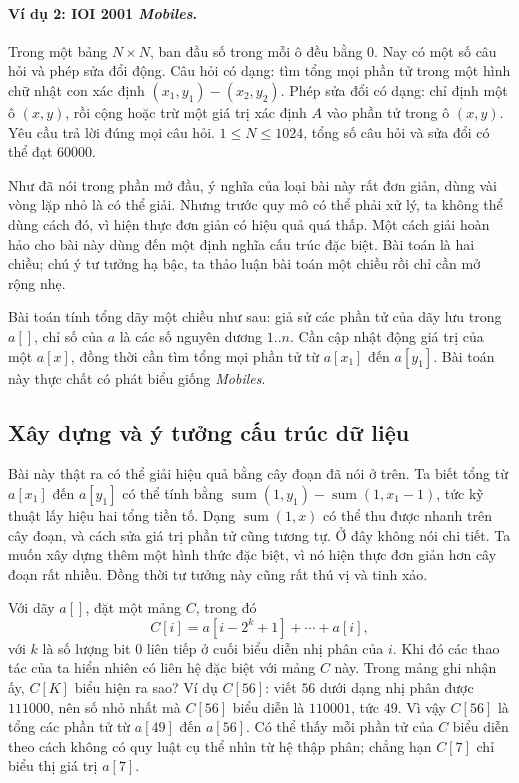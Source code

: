 \documentclass[11pt]{article}
\begin{document}
\paragraph{Ví dụ 2: IOI 2001 \textit{Mobiles}.}
Trong một bảng \(N\times N\), ban đầu số trong mỗi ô đều bằng \(0\). Nay có
một số câu hỏi và phép sửa đổi động. Câu hỏi có dạng: tìm tổng mọi phần tử
trong một hình chữ nhật con xác định \((x_1,y_1)-(x_2,y_2)\). Phép sửa đổi
có dạng: chỉ định một ô \((x,y)\), rồi cộng hoặc trừ một giá trị xác định
\(A\) vào phần tử trong ô \((x,y)\). Yêu cầu trả lời đúng mọi câu hỏi.
\(1\le N\le 1024\), tổng số câu hỏi và sửa đổi có thể đạt \(60000\).

Như đã nói trong phần mở đầu, ý nghĩa của loại bài này rất đơn giản, dùng
vài vòng lặp nhỏ là có thể giải. Nhưng trước quy mô có thể phải xử lý, ta
không thể dùng cách đó, vì hiện thực đơn giản có hiệu quả quá thấp. Một cách
giải hoàn hảo cho bài này dùng đến một định nghĩa cấu trúc đặc biệt. Bài toán
là hai chiều; chú ý tư tưởng hạ bậc, ta thảo luận bài toán một chiều rồi chỉ
cần mở rộng nhẹ.

Bài toán tính tổng dãy một chiều như sau: giả sử các phần tử của dãy lưu trong
\(a[]\), chỉ số của \(a\) là các số nguyên dương \(1..n\). Cần cập nhật động
giá trị của một \(a[x]\), đồng thời cần tìm tổng mọi phần tử từ \(a[x_1]\) đến
\(a[y_1]\). Bài toán này thực chất có phát biểu giống \textit{Mobiles}.

\subsection{Xây dựng và ý tưởng cấu trúc dữ liệu}

Bài này thật ra có thể giải hiệu quả bằng cây đoạn đã nói ở trên. Ta biết tổng
từ \(a[x_1]\) đến \(a[y_1]\) có thể tính bằng
\(\operatorname{sum}(1,y_1)-\operatorname{sum}(1,x_1-1)\), tức kỹ thuật lấy
hiệu hai tổng tiền tố. Dạng \(\operatorname{sum}(1,x)\) có thể thu được nhanh
trên cây đoạn, và cách sửa giá trị phần tử cũng tương tự. Ở đây không nói chi
tiết. Ta muốn xây dựng thêm một hình thức đặc biệt, vì nó hiện thực đơn giản
hơn cây đoạn rất nhiều. Đồng thời tư tưởng này cũng rất thú vị và tinh xảo.

Với dãy \(a[]\), đặt một mảng \(C\), trong đó
\[
  C[i]=a[i-2^k+1]+\cdots+a[i],
\]
với \(k\) là số lượng bit \(0\) liên tiếp ở cuối biểu diễn nhị phân của \(i\).
Khi đó các thao tác của ta hiển nhiên có liên hệ đặc biệt với mảng \(C\) này.
Trong mảng ghi nhận ấy, \(C[K]\) biểu hiện ra sao? Ví dụ \(C[56]\): viết
\(56\) dưới dạng nhị phân được \(111000\), nên số nhỏ nhất mà \(C[56]\) biểu
diễn là \(110001\), tức \(49\). Vì vậy \(C[56]\) là tổng các phần tử từ
\(a[49]\) đến \(a[56]\). Có thể thấy mỗi phần tử của \(C\) biểu diễn theo
cách không có quy luật cụ thể nhìn từ hệ thập phân; chẳng hạn \(C[7]\) chỉ
biểu thị giá trị \(a[7]\).
\end{document}
